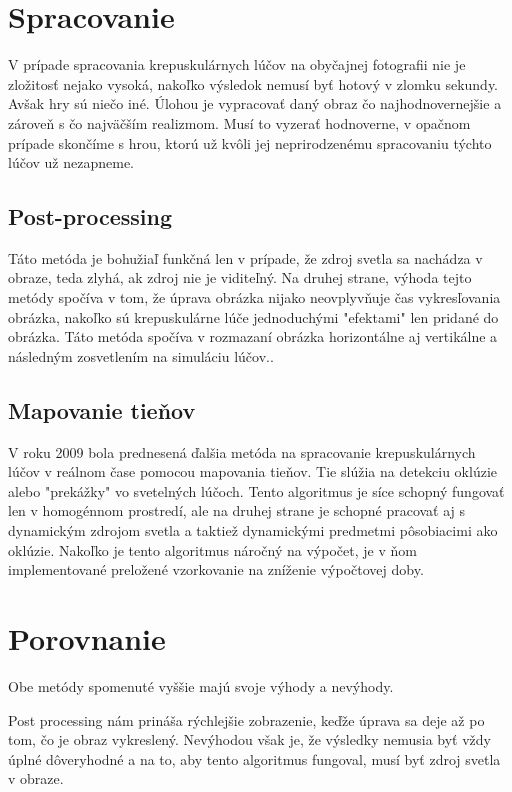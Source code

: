 \documentclass[10pt,twoside,slovak,a4paper]{article}
\begin{document}
\section{Spracovanie} \label{spracovanie}
V prípade spracovania krepuskulárnych lúčov na obyčajnej fotografii nie je zložitosť 
nejako vysoká, nakoľko výsledok nemusí byť hotový v zlomku sekundy. Avšak hry sú niečo 
iné. Úlohou je vypracovať daný obraz čo najhodnovernejšie a zároveň s čo najväčším 
realizmom. Musí to vyzerať hodnoverne, v opačnom prípade skončíme s hrou, ktorú už 
kvôli jej neprirodzenému spracovaniu týchto lúčov už nezapneme.

\subsection{Post-processing} \label{spracovanie:pp}
Táto metóda je bohužiaľ funkčná len v prípade, že zdroj svetla sa nachádza v obraze, 
teda zlyhá, ak zdroj nie je viditeľný. Na druhej strane, výhoda tejto metódy spočíva 
v tom, že úprava obrázka nijako neovplyvňuje čas vykresľovania obrázka, nakoľko sú 
krepuskulárne lúče jednoduchými "efektami" len pridané do obrázka. Táto metóda spočíva 
v rozmazaní obrázka horizontálne aj vertikálne a následným zosvetlením na simuláciu 
lúčov.\cite{Light_shafts}.

\subsection{Mapovanie tieňov} \label{spracovanie:mt}
V roku 2009 bola prednesená ďalšia metóda na spracovanie krepuskulárnych lúčov v 
reálnom čase pomocou mapovania tieňov. Tie slúžia na detekciu oklúzie alebo "prekážky" 
vo svetelných lúčoch. Tento algoritmus je síce schopný fungovať len v homogénnom prostredí, 
ale na druhej strane je schopné pracovať aj s dynamickým zdrojom svetla a taktiež dynamickými 
predmetmi pôsobiacimi ako oklúzie. Nakoľko je tento algoritmus náročný na výpočet, je v ňom 
implementované preložené vzorkovanie na zníženie výpočtovej doby\cite{God_rays}.

\section{Porovnanie} 
\label{por}
Obe metódy spomenuté vyššie majú svoje výhody  a nevýhody.

Post processing nám prináša rýchlejšie zobrazenie, keďže úprava sa deje až po tom, čo je 
obraz vykreslený. Nevýhodou však je, že výsledky nemusia byť vždy úplné dôveryhodné a na to, 
aby tento algoritmus fungoval, musí byť zdroj svetla v obraze. 
\end{document}
